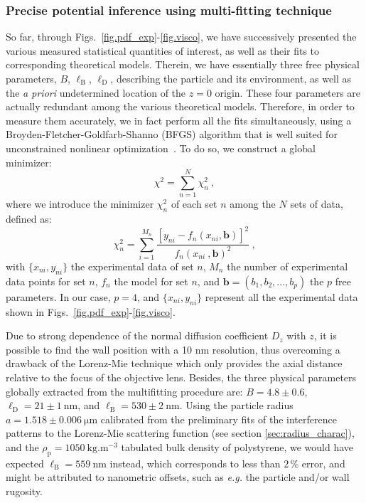 \subsubsection{Precise potential inference using multi-fitting technique}
\label{sec:multi}
So far, through Figs.~\ref{fig.pdf_exp}-\ref{fig.visco}, we have successively presented the various measured statistical quantities of interest, as well as their fits to corresponding theoretical models. Therein, we have essentially three free physical parameters, $B$, $\ell_\mathrm{B}$, $\ell_\mathrm{D}$, describing the particle and its environment, as well as the \textit{a priori} undetermined location of the $z=0$ origin. These four parameters are actually redundant among the various theoretical models. Therefore, in order to measure them accurately, we in fact perform all the fits simultaneously,
using a Broyden-Fletcher-Goldfarb-Shanno (BFGS) algorithm that is well suited for unconstrained
nonlinear optimization~\cite{dai_convergence_2002}. To do so, we construct a global minimizer:
\begin{equation}
	\chi ^ 2 = \sum _{n=1} ^{N} \chi_n ^ 2\ ,
\end{equation}
where we introduce the minimizer $\chi _n ^2$ of each set $n$ among the $N$ sets of data, defined as:
\begin{equation}
	\chi _n ^2 = \sum _{i=1} ^{M_n} \frac{[y_{ni} - f_n(x_{ni}, \mathbf{b})]^2 }{f_n(x_{ni}\ , \mathbf{b})^2}\ ,
\end{equation}
with $\{x_{ni},y_{ni}\}$ the experimental data of set $n$, $M_n$ the number of experimental data points for set $n$, $f_n$ the model for set $n$, and $\mathbf{b}=(b_1,b_2,...,b_p)$ the $p$ free parameters. In our case, $p=4$, and $\{x_{ni},y_{ni}\}$ represent all the experimental data shown in Figs.~\ref{fig.pdf_exp}-\ref{fig.visco}. 

Due to strong dependence of the normal diffusion coefficient $D_z$ with $z$, it is possible to find the wall position with a 10 nm resolution, thus overcoming a drawback of the Lorenz-Mie technique which only provides the axial distance relative to the focus of the objective lens. Besides, the three physical parameters globally extracted from the multifitting procedure are: $B = 4.8 \pm 0.6$, $\ell_\mathrm{D} = 21 \pm 1~ \mathrm{nm} $, and $\ell_\mathrm{B} = 530 \pm 2~ \mathrm{nm}$. Using the particle radius $a = 1.518 \pm 0.006 ~ \mathrm{\mu m}$ calibrated from the preliminary fits of the interference patterns to the Lorenz-Mie scattering function (see section \ref{sec:radius_charac}), and the $\rho_\mathrm{p} = 1050 ~ \mathrm{kg.m^{-3}}$ tabulated bulk density of polystyrene, we would have expected $\ell_\mathrm{B}=559 ~ \mathrm{nm}$ instead, which corresponds to less than $2\,\%$ error, and might be attributed to nanometric offsets, such as \textit{e.g.} the particle and/or wall rugosity. 

